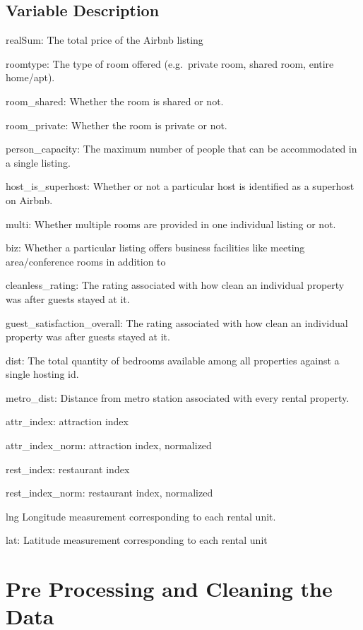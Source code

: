 \documentclass[
]{article}
\begin{document}
\hypertarget{variable-description}{%
\subsection{Variable Description}\label{variable-description}}

realSum: The total price of the Airbnb listing

roomtype: The type of room offered (e.g.~private room, shared room,
entire home/apt).

room\_shared: Whether the room is shared or not.

room\_private: Whether the room is private or not.

person\_capacity: The maximum number of people that can be accommodated
in a single listing.

host\_is\_superhost: Whether or not a particular host is identified as a
superhost on Airbnb.

multi: Whether multiple rooms are provided in one individual listing or
not.

biz: Whether a particular listing offers business facilities like
meeting area/conference rooms in addition to

cleanless\_rating: The rating associated with how clean an individual
property was after guests stayed at it.

guest\_satisfaction\_overall: The rating associated with how clean an
individual property was after guests stayed at it.

dist: The total quantity of bedrooms available among all properties
against a single hosting id.

metro\_dist: Distance from metro station associated with every rental
property.

attr\_index: attraction index

attr\_index\_norm: attraction index, normalized

rest\_index: restaurant index

rest\_index\_norm: restaurant index, normalized

lng Longitude measurement corresponding to each rental unit.

lat: Latitude measurement corresponding to each rental unit

\hypertarget{pre-processing-and-cleaning-the-data}{%
\section{Pre Processing and Cleaning the
Data}\label{pre-processing-and-cleaning-the-data}}
\end{document}
